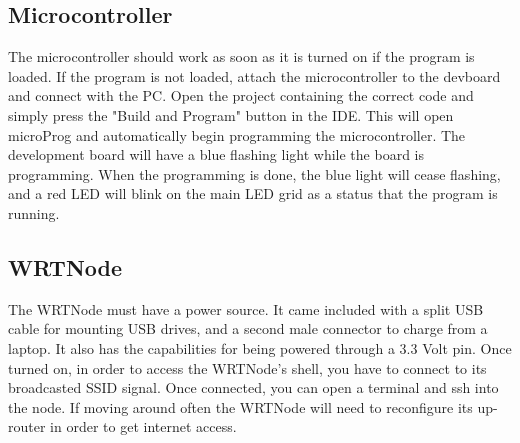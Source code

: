 \documentclass[paper=a4, fontsize=11pt]{scrartcl}
\numberwithin{equation}{section}		%
\numberwithin{figure}{section}			%
\numberwithin{table}{section}				%
\begin{document}
 \subsection{Microcontroller} 
 The microcontroller should work as soon as it is turned on if the program is loaded. If the program is not loaded, attach the microcontroller to the devboard and connect with the PC. Open the project containing the correct code and simply press the "Build and Program" button in the IDE. This will open microProg and automatically begin programming the microcontroller. The development board will have a blue flashing light while the board is programming. When the programming is done, the blue light will cease flashing, and a red LED will blink on the main LED grid as a status that the program is running. \\
 \subsection{WRTNode}
 The WRTNode must have a power source. It came included with a split USB cable for mounting USB drives, and a second male connector to charge from a laptop. It also has the capabilities for being powered through a 3.3 Volt pin. Once turned on, in order to access the WRTNode's shell, you have to connect to its broadcasted SSID signal. Once connected, you can open a terminal and ssh into the node. If moving around often the WRTNode will need to reconfigure its up-router in order to get internet access.\\
\end{document}
